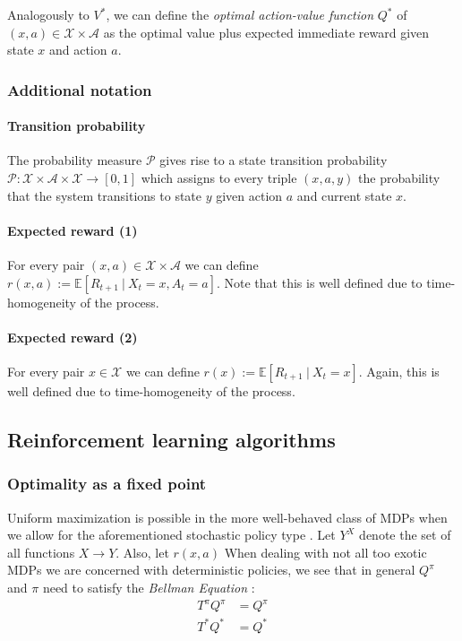 \documentclass{article}
\theoremstyle{definition}
\theoremstyle{remark}
\newcommand{\stat}{\mathcal{X}}
\newcommand{\act}{\mathcal{A}}
\newcommand{\prob}{\mathcal{P}}
\begin{document}
Analogously to $V^*$, we can define the \textit{optimal action-value function} $Q^*$ of $(x,a)\in \stat \times \act$ as the optimal value plus expected immediate reward given state $x$ and action $a$.

\subsubsection{Additional notation}

\paragraph{Transition probability} The probability measure $\prob$ gives rise to a state transition probability $\prob : \stat \times \act \times \stat \rightarrow [0,1]$ which assigns to every triple $(x,a,y)$ the probability that the system transitions to state $y$ given action $a$ and current state $x$.

\paragraph{Expected reward (1)} For every pair $(x,a)\in \stat \times \act$ we can define ${r(x,a) := \mathbb{E}[R_{t+1} \ | \ X_t = x, A_t = a]}$. Note that this is well defined due to time-homogeneity of the process.

\paragraph{Expected reward (2)} For every pair $x\in \stat$ we can define ${r(x) := \mathbb{E}[R_{t+1} \ | \ X_t = x]}$. Again, this is well defined due to time-homogeneity of the process.

\subsection{Reinforcement learning algorithms}
\subsubsection{Optimality as a fixed point}

Uniform maximization is possible in the more well-behaved class of MDPs when we allow for the aforementioned stochastic policy type \cite{Szepesvari2010}. Let $Y^X$ denote the set of all functions $X\rightarrow Y$. Also, let $r(x,a)$ When dealing with not all too exotic MDPs  we are concerned with deterministic policies, we see that in general $Q^\pi$ and $\pi$ need to satisfy the \textit{Bellman Equation} \cite{suttonbarto2018, Szepesvari2010}:
\begin{align}
    T^\pi Q^\pi &= Q^\pi \\
    T^*Q^* &= Q^*
\end{align}
\end{document}
